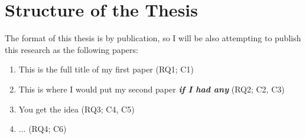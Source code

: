 \section{Structure of the Thesis} \label{sec:thes}
The format of this thesis is by publication, so I will be also attempting to publish this research as the following papers:
\begin{enumerate}[start=1,label={P\arabic*:},wide = 0pt, leftmargin = 3em]
	\item This is the full title of my first paper (RQ1; C1)
	\item This is where I would put my second paper \textit{\textbf{if I had any}} (RQ2; C2, C3)
	\item You get the idea (RQ3; C4, C5)
	\item ... (RQ4; C6)
\end{enumerate}

